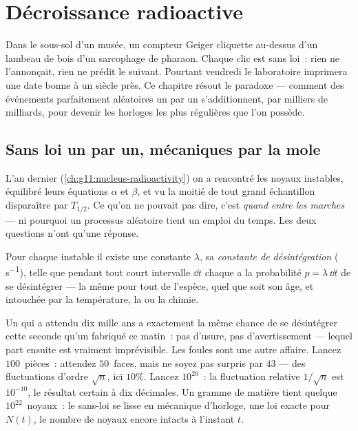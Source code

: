 \chapter{Décroissance radioactive}\label{ch:g12:radioactive-decay}

Dans le sous-sol d'un musée, un compteur Geiger cliquette au-dessus
d'un lambeau de bois d'un sarcophage de pharaon. Chaque clic est
sans loi~: rien ne l'annonçait, rien ne prédit le suivant. Pourtant
vendredi le laboratoire imprimera une date bonne à un siècle près.
Ce chapitre résout le paradoxe --- comment des événements parfaitement
aléatoires un par un s'additionnent, par milliers de milliards, pour
devenir les horloges les plus régulières que l'on possède.

\section{Sans loi un par un, mécaniques par la mole}

L'an dernier (\cref{ch:g11:nucleus-radioactivity}) on a rencontré les
noyaux instables, équilibré leurs équations $\alpha$ et
$\beta$, et vu la moitié de tout grand échantillon disparaître par
 $T_{1/2}$. Ce qu'on ne pouvait pas dire,
c'est \emph{quand entre les marches} --- ni pourquoi un processus
aléatoire tient un emploi du temps. Les deux questions n'ont qu'une
réponse.

\begin{definition}\label{def:g12:radioactive-decay:lambda}
Pour chaque 
instable il existe une constante $\lambda$, sa
\emph{constante de désintégration} ( \unit{s^{-1}}), telle que
pendant tout court intervalle $\dd t$ chaque
 a la probabilité $p = \lambda\,\dd t$ de
se désintégrer --- la même pour tout  de
l'espèce, quel que soit son âge, et intouchée par la température, la
 ou la chimie.
\end{definition}

\begin{remark}\label{rem:g12:radioactive-decay:crowds}
Un  qui a attendu dix mille ans a
exactement la même chance de se désintégrer cette seconde qu'un
fabriqué ce matin~: pas d'usure, pas d'avertissement --- lequel part
ensuite est vraiment imprévisible. Les foules sont une autre affaire.
Lancez $100$~pièces~: attendez $50$~faces, mais ne soyez pas surpris
par $43$ --- des fluctuations d'ordre $\sqrt n$, ici $10\%$. Lancez
$10^{20}$~: la fluctuation relative $1/\sqrt n$ est $10^{-10}$, le
résultat certain à dix décimales. Un gramme de matière tient quelque
$10^{22}$~noyaux~: le sans-loi se lisse en mécanique d'horloge, une
loi exacte pour $N(t)$, le nombre de noyaux encore intacts à l'instant
$t$.
\end{remark}

